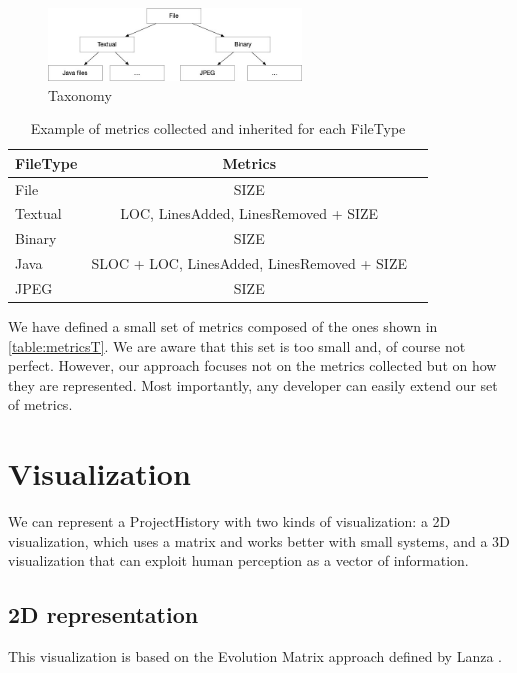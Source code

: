 \begin{figure}
    \centering
    \includegraphics[width=0.6\textwidth]{Taxonomy.jpg}
    \caption{Taxonomy}
    \label{fig:taxonomy}
\end{figure}

\begin{table}[ht]
    \centering
    \begin{tabular}{lcr} \hline
        {\bf FileType} & {\bf Metrics}\\ \hline
        File    & SIZE      \\
        Textual & LOC, LinesAdded, LinesRemoved + SIZE \\
        Binary  & SIZE         \\
        Java    & SLOC + LOC, LinesAdded, LinesRemoved + SIZE \\
        JPEG    & SIZE \\
    \end{tabular}
    \caption{Example of metrics collected and inherited for each FileType}
    \label{table:metricsT}
\end{table}

We have defined a small set of metrics composed of the ones shown in \autoref{table:metricsT}. We are aware that this set is too small and, of course not perfect. However, our approach focuses not on the metrics collected but on how they are represented. Most importantly, any developer can easily extend our set of metrics.


\section{Visualization}
We can represent a ProjectHistory with two kinds of visualization: a 2D visualization, which uses a matrix and works better with small systems, and a 3D visualization that can exploit human perception as a vector of information. 


\subsection{2D representation}
This visualization is based on the Evolution Matrix approach defined by Lanza \cite{Lanza2001}. 

